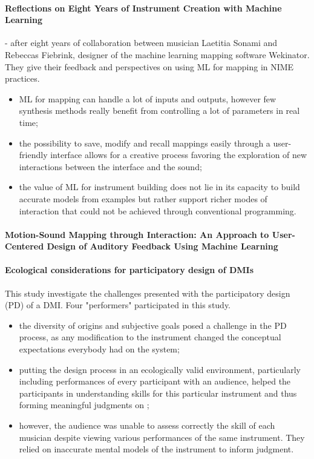 \documentclass[11pt]{article}
\begin{document}
\paragraph{Reflections on Eight Years of Instrument Creation with Machine Learning} \citep{fiebrink_reflections_2020} - after eight years of collaboration between musician Laetitia Sonami and Rebeccas Fiebrink, designer of the machine learning mapping software Wekinator. They give their feedback and perspectives on using ML for mapping in NIME practices.
\begin{itemize}
    \item ML for mapping can handle a lot of inputs and outputs, however few synthesis methods really benefit from controlling a lot of parameters in real time;
    \item the possibility to save, modify and recall mappings easily through a user-friendly interface allows for a creative process favoring the exploration of new interactions between the interface and the sound;
    \item the value of ML for instrument building does not lie in its capacity to build accurate models from examples but rather support richer modes of interaction that could not be achieved through conventional programming.
\end{itemize}

\paragraph{Motion-Sound Mapping through Interaction: An Approach to User-Centered Design of Auditory Feedback Using Machine Learning} \citep{francoise_motion-sound_2018}

\paragraph{Ecological considerations for participatory design of DMIs} \citep{fyans_ecological_2012}
This study investigate the challenges presented with the participatory design (PD) of a DMI. Four "performers" participated in this study.
\begin{itemize}
    \item the diversity of origins and subjective goals posed a challenge in the PD process, as any modification to the instrument changed the conceptual expectations everybody had on the system;
    \item putting the design process in an ecologically valid environment, particularly including performances of every participant with an audience, helped the participants in understanding skills for this particular instrument and thus forming meaningful judgments on ;
    \item however, the audience was unable to assess correctly the skill of each musician despite viewing various performances of the same instrument. They relied on inaccurate mental models of the instrument to inform judgment. 
\end{itemize}
\end{document}
